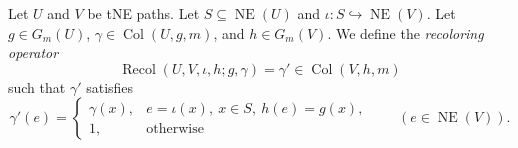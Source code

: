 \begin{definition}\label{def:recolor}
Let $U$ and $V$ be tNE paths. Let $S\subseteq\operatorname{NE}(U)$ and
$\iota\colon S\hookrightarrow\operatorname{NE}(V)$.
Let $g\in G_m(U)$, $\gamma\in\operatorname{Col}(U,g,m)$, and $h\in G_m(V)$.
We define the \textit{recoloring operator}
\[
 \operatorname{Recol}(U,V,\iota,h;g,\gamma)=\gamma'\in\operatorname{Col}(V,h,m)
\]
such that $\gamma'$ satisfies
\begin{equation}\label{eq:color-update}
 \gamma'(e)=
 \begin{cases}
 \gamma(x),&e=\iota(x),\ x\in S,\ h(e)=g(x),\\
 1,&\text{otherwise}
 \end{cases}
 \qquad(e\in\operatorname{NE}(V)).
\end{equation}
\end{definition}
